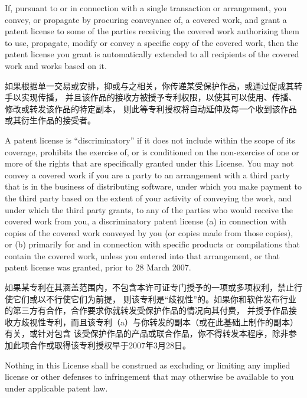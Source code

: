 \documentclass[11pt]{article}
\begin{document}
\begin{enumerate}
        If, pursuant to or in connection with a single transaction or
        arrangement, you convey, or propagate by procuring conveyance of, a
        covered work, and grant a patent license to some of the parties
        receiving the covered work authorizing them to use, propagate, modify
        or convey a specific copy of the covered work, then the patent license
        you grant is automatically extended to all recipients of the covered
        work and works based on it.

        如果根据单一交易或安排，抑或与之相关，你传递某受保护作品，或通过促成其转手以实现传播，
        并且该作品的接收方被授予专利权限，以使其可以使用、传播、修改或转发该作品的特定副本，
        则此等专利授权将自动延伸及每一个收到该作品或其衍生作品的接受者。

        A patent license is ``discriminatory'' if it does not include within
        the scope of its coverage, prohibits the exercise of, or is
        conditioned on the non-exercise of one or more of the rights that are
        specifically granted under this License.  You may not convey a covered
        work if you are a party to an arrangement with a third party that is
        in the business of distributing software, under which you make payment
        to the third party based on the extent of your activity of conveying
        the work, and under which the third party grants, to any of the
        parties who would receive the covered work from you, a discriminatory
        patent license (a) in connection with copies of the covered work
        conveyed by you (or copies made from those copies), or (b) primarily
        for and in connection with specific products or compilations that
        contain the covered work, unless you entered into that arrangement,
        or that patent license was granted, prior to 28 March 2007.

        如果某专利在其涵盖范围内，不包含本许可证专门授予的一项或多项权利，禁止行使它们或以不行使它们为前提，
        则该专利是“歧视性”的。如果你和软件发布行业的第三方有合作，合作要求你就转发受保护作品的情况向其付费，
        并授予作品接收方歧视性专利，而且该专利（a）与你转发的副本（或在此基础上制作的副本）有关，或针对包含
        该受保护作品的产品或联合作品，你不得转发本程序，除非参加此项合作或取得该专利授权早于2007年3月28日。

        Nothing in this License shall be construed as excluding or limiting
        any implied license or other defenses to infringement that may
        otherwise be available to you under applicable patent law.


\end{enumerate}
\end{document}
